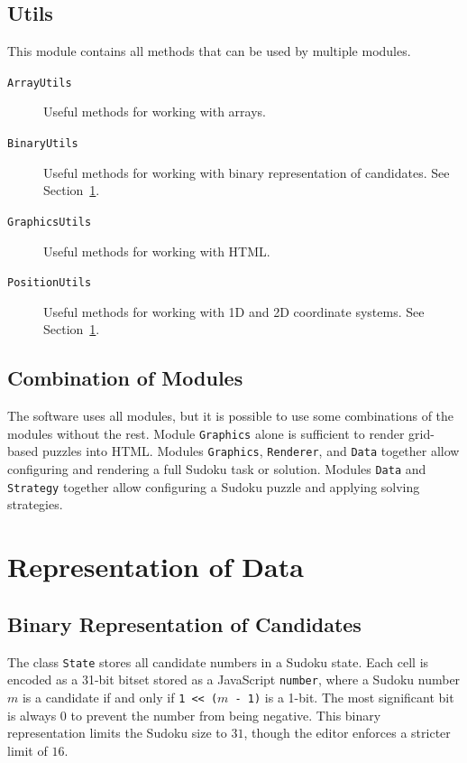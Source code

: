 \subsection*{Utils}

This module contains all methods that can be used by multiple modules.

\begin{description}
    \item[\texttt{ArrayUtils}]
    Useful methods for working with arrays.

    \item[\texttt{BinaryUtils}]
    Useful methods for working with binary representation of candidates.
    See Section~\ref{sec:data}.

    \item[\texttt{GraphicsUtils}]
    Useful methods for working with HTML\@.

    \item[\texttt{PositionUtils}]
    Useful methods for working with 1D and 2D coordinate systems.
    See Section~\ref{sec:data}.
\end{description}

\subsection*{Combination of Modules}

The software uses all modules, but it is possible to use some combinations of the modules without the rest.
Module \texttt{Graphics} alone is sufficient to render grid-based puzzles into HTML\@.
Modules \texttt{Graphics}, \texttt{Renderer}, and \texttt{Data} together allow
configuring and rendering a full Sudoku task or solution.
Modules \texttt{Data} and \texttt{Strategy} together allow configuring a Sudoku puzzle and applying solving strategies.

\section{Representation of Data}\label{sec:data}

\subsection*{Binary Representation of Candidates}

The class \texttt{State} stores all candidate numbers in a Sudoku state.
Each cell is encoded as a 31-bit bitset stored as a JavaScript \texttt{number},
where a Sudoku number $m$ is a candidate if and only if \texttt{1 << ($m$ - 1)} is a 1-bit.
The most significant bit is always 0 to prevent the number from being negative.
This binary representation limits the Sudoku size to $31$, though the editor enforces a stricter limit of $16$.


